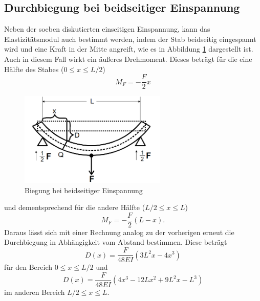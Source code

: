 \subsection{Durchbiegung bei beidseitiger Einspannung}
Neben der soeben diskutierten einseitigen Einspannung, kann das Elastizitätsmodul auch bestimmt werden, indem der Stab beidseitig eingespannt wird und eine Kraft
in der Mitte angreift, wie es in Abbildung \ref{fig:beidseitig} dargestellt ist. Auch in diesem Fall wirkt ein äußeres Drehmoment. Dieses beträgt für die eine Hälfte des Stabes ($0\leq x \leq L/2$)
\begin{equation*}
M_F=-\frac{F}{2}x
\end{equation*}
\begin{figure}
\centering
\includegraphics[width=7cm, keepaspectratio]{Biegung beidseitig}
\caption{Biegung bei beidseitiger Einspannung}
\label{fig:beidseitig}
\end{figure}
und dementsprechend für die andere Hälfte ($L/2\leq x \leq L$)
\begin{equation*}
M_F=-\frac{F}{2}(L-x).
\end{equation*}
Daraus lässt sich mit einer Rechnung analog zu der vorherigen erneut die Durchbiegung in Abhängigkeit vom Abstand bestimmen. Diese beträgt
\begin{equation}
D(x)=\frac{F}{48EI}(3L^2x-4x^3)
\end{equation}
für den Bereich $0\leq x \leq L/2$ und 
\begin{equation}
D(x)=\frac{F}{48EI}(4x^3-12Lx^2+9L^2x-L^3)
\end{equation}
im anderen Bereich $L/2\leq x \leq L$.
